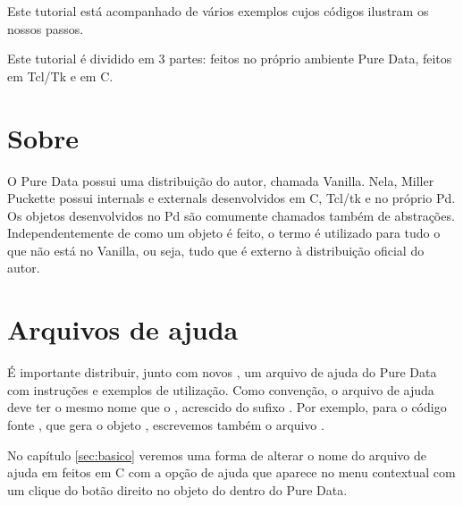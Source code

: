 Este tutorial está acompanhado de vários exemplos cujos códigos ilustram os nossos
passos.

Este tutorial é dividido em 3 partes: \externals feitos no próprio ambiente Pure
Data, feitos em Tcl/Tk e em C.

\section{Sobre \Externals}
O Pure Data possui uma distribuição do autor, chamada Vanilla.
Nela, Miller Puckette possui internals e externals desenvolvidos em C, Tcl/tk e
no próprio Pd.
Os objetos desenvolvidos no Pd são comumente chamados também de abstrações.
Independentemente de como um objeto é feito, o termo \external é utilizado para
tudo o que não está no Vanilla, ou seja, tudo que é externo à distribuição
oficial do autor.

\section{Arquivos de ajuda}

É importante distribuir, junto com novos \externals, um arquivo de ajuda do
Pure Data com instruções e exemplos de utilização. Como convenção, o arquivo
de ajuda deve ter o mesmo nome que o \external, acrescido do sufixo
. Por exemplo, para o código fonte , que
gera o objeto , escrevemos também o arquivo
.


No capítulo \ref{sec:basico} veremos uma forma de alterar o nome do arquivo de
ajuda em \externals feitos em C com a opção de ajuda que aparece no menu
contextual com um clique do botão direito no objeto do \external dentro do Pure Data.

